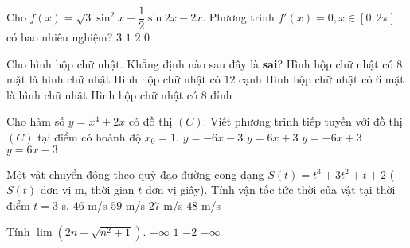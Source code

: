 \begin{ex}%
Cho $f(x)=\sqrt{3}\sin ^2 x+\dfrac{1}{2}\sin 2x -2x$. Phương trình $f'(x)=0, x\in [0; 2\pi]$ có bao nhiêu nghiệm?
\choice
{$3$}
{$1$}
{\True $2$}
{$0$}
\end{ex}

\begin{ex}%
Cho hình hộp chữ nhật. Khẳng định nào sau đây là \textbf{sai}?
\choice
{\True Hình hộp chữ nhật có $8$ mặt là hình chữ nhật}
{ Hình hộp chữ nhật có $12$ cạnh}
{ Hình hộp chữ nhật có $6$ mặt là hình chữ nhật}
{Hình hộp chữ nhật có $8$ đỉnh}
\end{ex}

\begin{ex}%
Cho hàm số $y= x^4+2x$ có đồ thị $(C)$. Viết phương trình tiếp tuyến với đồ thị $(C)$ tại điểm có hoành độ $x_0=1$.
\choice
{$y=-6x-3$}
{$y=6x+3$}
{$y=-6x+3$}
{\True $y=6x-3$}
\end{ex}

\begin{ex}%
Một vật chuyển động theo quỹ đạo đường cong dạng $S(t)=t^3+3t^2+t+2$ ($S(t)$ đơn vị m, thời gian $t$ đơn vị giây). Tính vận tốc tức thời của vật tại thời điểm $t=3$ s.
\choice
{\True $46$ m/s}
{$59$ m/s}
{$27$ m/s}
{$48$ m/s}
\end{ex}

\begin{ex}%
Tính $\lim (2n+\sqrt{n^2+1})$.
\choice
{\True $+\infty$}
{$1$}
{$-2$}
{$-\infty$}
\end{ex}

